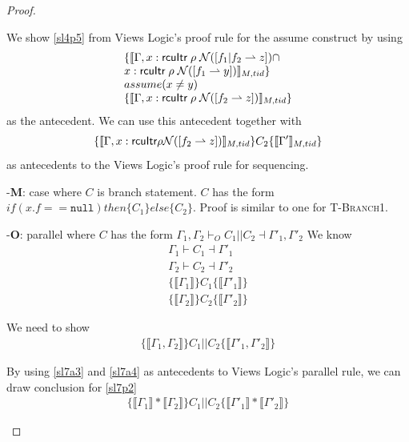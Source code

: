 \begin{proof}
\begin{case}
We show \ref{sl4p5} from Views Logic's proof rule for the assume construct by using 
      \[
      \begin{array}{l}
      \{\llbracket \Gamma, x:\textsf{rcuItr}\;\rho\;\mathcal{N}([f_1 | f_2 \rightharpoonup z]) \cap\\
      x:\textsf{rcuItr}\;\rho\;\mathcal{N}([f_1 \rightharpoonup y]) \rrbracket_{M,tid} \}\\
      assume(x\neq y)\\
      \{\llbracket  \Gamma,x:\textsf{rcuItr}\;\rho\;\mathcal{N}([f_2 \rightharpoonup z]) \rrbracket_{M,tid} \}
      \end{array}
      \]
      as the antecedent. We can use this antecedent together with 
      \[ \{\llbracket\Gamma,   x:\textsf{rcuItr}\rho\mathcal{N}([f_2  \rightharpoonup z])\rrbracket_{M,tid}\} C_2 \{\llbracket\Gamma' \rrbracket_{M,tid}\} \]
      as antecedents to the Views Logic's proof rule for sequencing.
  \end{case}
  
  \begin{case}-\textbf{M}: case where $C$ is branch statement. $C$ has the form $if(x.f == \texttt{null})then\{C_1\}else\{C_2\}$.
    Proof is similar to one for \textsc{T-Branch1}.
   \end{case}

\begin{case}-\textbf{O}: parallel where $C$ has the form $\Gamma_1,\Gamma_2\vdash_{O} C_1 || C_2 \dashv \Gamma'_1,\Gamma'_2$
We know 
\begin{gather} \label{sl7a1}
\Gamma_1 \vdash C_1 \dashv \Gamma'_1\\
\label{sl7a2}
\Gamma_2 \vdash C_2 \dashv \Gamma'_2\\
\label{sl7a3}
\{ \llbracket \Gamma_1 \rrbracket \} C_1 \{ \llbracket \Gamma'_1 \rrbracket\}\\
\label{sl7a4}
\{ \llbracket \Gamma_2 \rrbracket \} C_2  \{ \llbracket \Gamma'_2 \rrbracket \}
\end{gather}

We need to show 
\begin{gather}\label{sl7p1}
\{\llbracket \Gamma_1, \Gamma_2 \rrbracket \} C_1 || C_2 \{\llbracket \Gamma'_1, \Gamma'_2 \rrbracket \}
\end{gather}

By using \ref{sl7a3} and \ref{sl7a4} as antecedents to Views Logic's parallel rule, we can draw conclusion for \ref{sl7p2}
\begin{gather}\label{sl7p2}
\{\llbracket \Gamma_1 \rrbracket * \llbracket \Gamma_2 \rrbracket\} C_1 || C_2\{\llbracket \Gamma'_1 \rrbracket * \llbracket \Gamma'_2 \rrbracket\}
\end{gather}


\end{case}
\end{proof}
